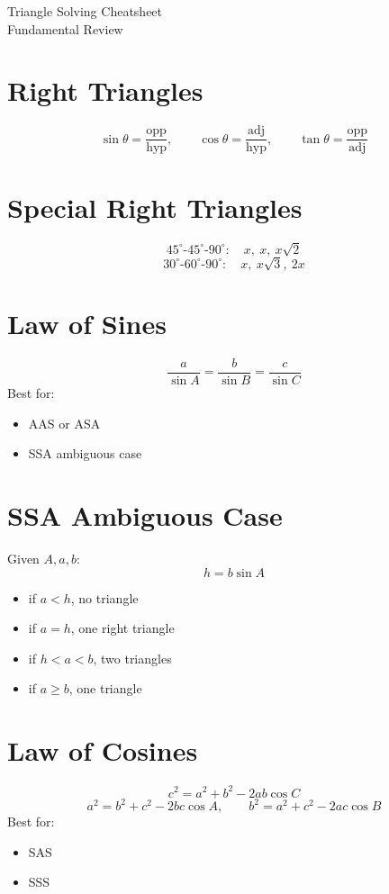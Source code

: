 \documentclass[11pt]{article}
\begin{document}
\begin{center}
{\LARGE Triangle Solving Cheatsheet}\\[0.4em]
{\large Fundamental Review}
\end{center}

\section*{Right Triangles}
\[
\sin\theta=\frac{\text{opp}}{\text{hyp}},\qquad
\cos\theta=\frac{\text{adj}}{\text{hyp}},\qquad
\tan\theta=\frac{\text{opp}}{\text{adj}}
\]

\section*{Special Right Triangles}
\[
45^\circ\text{-}45^\circ\text{-}90^\circ:\quad x,\ x,\ x\sqrt2
\]
\[
30^\circ\text{-}60^\circ\text{-}90^\circ:\quad x,\ x\sqrt3,\ 2x
\]

\section*{Law of Sines}
\[
\frac{a}{\sin A}=\frac{b}{\sin B}=\frac{c}{\sin C}
\]
Best for:
\begin{itemize}
  \item AAS or ASA
  \item SSA ambiguous case
\end{itemize}

\section*{SSA Ambiguous Case}
Given $A,a,b$:
\[
h=b\sin A
\]
\begin{itemize}
  \item if $a<h$, no triangle
  \item if $a=h$, one right triangle
  \item if $h<a<b$, two triangles
  \item if $a\ge b$, one triangle
\end{itemize}

\section*{Law of Cosines}
\[
c^2=a^2+b^2-2ab\cos C
\]
\[
a^2=b^2+c^2-2bc\cos A,\qquad
b^2=a^2+c^2-2ac\cos B
\]
Best for:
\begin{itemize}
  \item SAS
  \item SSS
\end{itemize}
\end{document}
